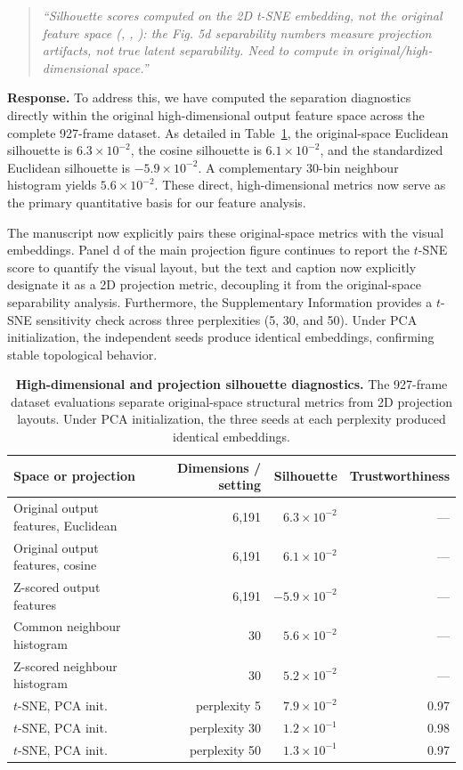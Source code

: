 \documentclass[11pt]{article}
\begin{document}
\begin{quote}\small \itshape
``Silhouette scores computed on the 2D t-SNE embedding, not the original feature space (, , ): the Fig. 5d separability numbers measure projection artifacts, not true latent separability. Need to compute in original/high-dimensional space.''\end{quote}

\textbf{Response.} 
To address this, we have computed the separation diagnostics directly within the original high-dimensional output feature space across the complete 927-frame dataset. As detailed in Table~\ref{tab:resp-c11-silhouette}, the original-space Euclidean silhouette is $6.3\times10^{-2}$, the cosine silhouette is $6.1\times10^{-2}$, and the standardized Euclidean silhouette is $-5.9\times10^{-2}$. A complementary 30-bin neighbour histogram yields $5.6\times10^{-2}$. These direct, high-dimensional metrics now serve as the primary quantitative basis for our feature analysis.

The manuscript now explicitly pairs these original-space metrics with the visual embeddings. Panel d of the main projection figure continues to report the $t$-SNE score to quantify the visual layout, but the text and caption now explicitly designate it as a 2D projection metric, decoupling it from the original-space separability analysis. Furthermore, the Supplementary Information provides a $t$-SNE sensitivity check across three perplexities (5, 30, and 50). Under PCA initialization, the independent seeds produce identical embeddings, confirming stable topological behavior.

\begin{table}[!htbp]
\centering\small
\caption{\textbf{High-dimensional and projection silhouette diagnostics.} The 927-frame dataset evaluations separate original-space structural metrics from 2D projection layouts. Under PCA initialization, the three seeds at each perplexity produced identical embeddings.}
\label{tab:resp-c11-silhouette}
\begin{tabular}{lrrr}
\toprule
Space or projection & Dimensions / setting & Silhouette & Trustworthiness \\
\midrule
Original output features, Euclidean & 6,191 & $6.3\times10^{-2}$ & --- \\
Original output features, cosine & 6,191 & $6.1\times10^{-2}$ & --- \\
Z-scored output features & 6,191 & $-5.9\times10^{-2}$ & --- \\
Common neighbour histogram & 30 & $5.6\times10^{-2}$ & --- \\
Z-scored neighbour histogram & 30 & $5.2\times10^{-2}$ & --- \\
$t$-SNE, PCA init. & perplexity 5 & $7.9\times10^{-2}$ & 0.97 \\
$t$-SNE, PCA init. & perplexity 30 & $1.2\times10^{-1}$ & 0.98 \\
$t$-SNE, PCA init. & perplexity 50 & $1.3\times10^{-1}$ & 0.97 \\
\bottomrule
\end{tabular}
\end{table}
\end{document}
